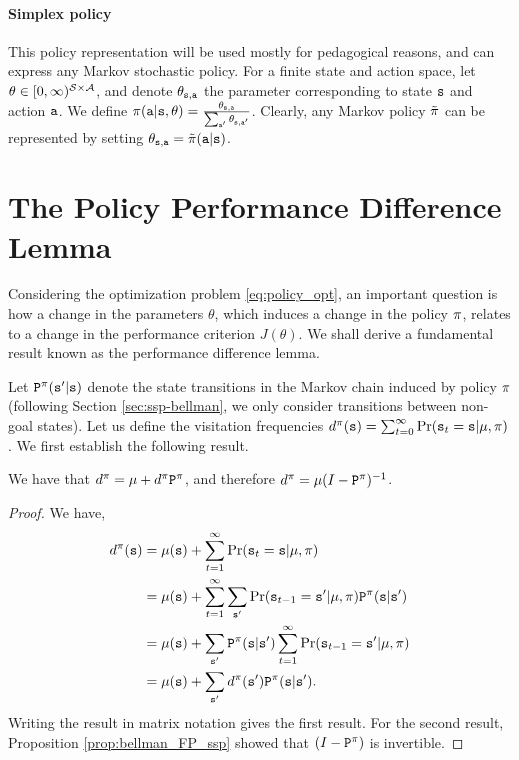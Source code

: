 \paragraph{Simplex policy} This policy representation will be used mostly for pedagogical reasons, and can express any Markov stochastic policy. For a finite state and action space, let $\theta \in [0,\infty)^{\mathcal{S} \times \mathcal{A}}$, and denote $\theta_{{\tt s},{\tt a}}$ the parameter corresponding to state ${\tt s}$ and action ${\tt a}$. We define $\pi({\tt a}|{\tt s},\theta) = \frac{\theta_{{\tt s},{\tt a}}}{\sum_{{\tt a}'} \theta_{{\tt s},{\tt a}'}}$. Clearly, any Markov policy $\tilde{\pi}$ can be represented by setting $\theta_{{\tt s},{\tt a}} = \tilde{\pi}({\tt a}|{\tt s})$.

\section{The Policy Performance Difference Lemma}

Considering the optimization problem \eqref{eq:policy_opt}, an important question is how a change in the parameters $\theta$, which induces a change in the policy $\pi$, relates to a change in the performance criterion $J(\theta)$. We shall derive a fundamental result known as the performance difference lemma.

Let ${\tt P}^{\pi}({\tt s}' | {\tt s})$ denote the state transitions in the Markov chain induced by policy $\pi$ (following Section \ref{sec:ssp-bellman}, we only consider transitions between non-goal states). Let us define the visitation frequencies $d^{\pi}({\tt s}) = \sum_{t=0}^\infty \Pr({\tt s}_t = {\tt s} | \mu, \pi)$. We first establish the following result.
\begin{proposition}\label{prop:visitation_freq}
    We have that $d^{\pi} = \mu + d^{\pi} {\tt P}^{\pi}$, and therefore $d^{\pi} = \mu (I - {\tt P}^{\pi})^{-1}$.
\end{proposition}
\begin{proof}
We have,
\begin{equation*}
\begin{split}
        d^{\pi}({\tt s}) &= \mu({\tt s}) + \sum_{t=1}^\infty \Pr({\tt s}_t = {\tt s} | \mu, \pi) \\
        &= \mu({\tt s}) + \sum_{t=1}^\infty \sum_{{\tt s}'} \Pr({\tt s}_{t-1} = {\tt s}' | \mu, \pi) {\tt P}^{\pi}({\tt s} | {\tt s}')\\
       &= \mu({\tt s}) +  \sum_{{\tt s}'} {\tt P}^{\pi}({\tt s} | {\tt s}') \sum_{t=1}^\infty \Pr({\tt s}_{t-1} = {\tt s}' | \mu, \pi) \\
        &= \mu({\tt s}) + \sum_{{\tt s}'} d^{\pi}({\tt s}'){\tt P}^{\pi}({\tt s} | {\tt s}').
\end{split}
\end{equation*}
Writing the result in matrix notation gives the first result. For the second result, Proposition \ref{prop:bellman_FP_ssp} showed that $(I - {\tt P}^{\pi})$ is invertible. 
\end{proof}

